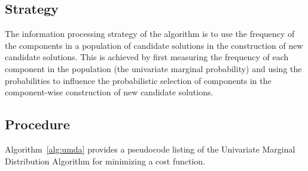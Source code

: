 \subsection{Strategy}
The information processing strategy of the algorithm is to use the frequency of the components in a population of candidate solutions in the construction of new candidate solutions.
This is achieved by first measuring the frequency of each component in the population (the univariate marginal probability) and using the probabilities to influence the probabilistic selection of components in the component-wise construction of new candidate solutions.

\subsection{Procedure}
Algorithm~\ref{alg:umda} provides a pseudocode listing of the Univariate Marginal Distribution Algorithm for minimizing a cost function.

